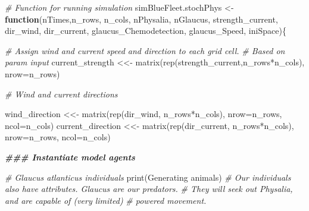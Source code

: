 \documentclass[
]{article}
\newenvironment{Shaded}{\begin{snugshade}}{\end{snugshade}}
\newcommand{\AttributeTok}[1]{\textcolor[rgb]{0.77,0.63,0.00}{#1}}
\newcommand{\CommentTok}[1]{\textcolor[rgb]{0.56,0.35,0.01}{\textit{#1}}}
\newcommand{\ControlFlowTok}[1]{\textcolor[rgb]{0.13,0.29,0.53}{\textbf{#1}}}
\newcommand{\DocumentationTok}[1]{\textcolor[rgb]{0.56,0.35,0.01}{\textbf{\textit{#1}}}}
\newcommand{\FunctionTok}[1]{\textcolor[rgb]{0.00,0.00,0.00}{#1}}
\newcommand{\NormalTok}[1]{#1}
\newcommand{\OtherTok}[1]{\textcolor[rgb]{0.56,0.35,0.01}{#1}}
\newcommand{\SpecialCharTok}[1]{\textcolor[rgb]{0.00,0.00,0.00}{#1}}
\newcommand{\StringTok}[1]{\textcolor[rgb]{0.31,0.60,0.02}{#1}}
\begin{document}
\begin{Shaded}
\begin{Highlighting}[]
\CommentTok{\# Function for running simulation }
\NormalTok{simBlueFleet.stochPhys }\OtherTok{\textless{}{-}} \ControlFlowTok{function}\NormalTok{(nTimes,n\_rows, n\_cols, nPhysalia, nGlaucus,}
\NormalTok{                                   strength\_current,}
\NormalTok{                                   dir\_wind, dir\_current,}
\NormalTok{                                   glaucus\_Chemodetection, glaucus\_Speed, iniSpace)\{}
  
  \CommentTok{\# Assign wind and current speed and direction to each grid cell.}
  \CommentTok{\# Based on param input}
\NormalTok{  current\_strength }\OtherTok{\textless{}\textless{}{-}} \FunctionTok{matrix}\NormalTok{(}\FunctionTok{rep}\NormalTok{(strength\_current,n\_rows}\SpecialCharTok{*}\NormalTok{n\_cols), }
                              \AttributeTok{nrow=}\NormalTok{n\_rows)}
  
  \CommentTok{\# Wind and current directions}
  
\NormalTok{  wind\_direction }\OtherTok{\textless{}\textless{}{-}} \FunctionTok{matrix}\NormalTok{(}\FunctionTok{rep}\NormalTok{(dir\_wind, n\_rows}\SpecialCharTok{*}\NormalTok{n\_cols), }
                            \AttributeTok{nrow=}\NormalTok{n\_rows, }\AttributeTok{ncol=}\NormalTok{n\_cols)}
\NormalTok{  current\_direction }\OtherTok{\textless{}\textless{}{-}} \FunctionTok{matrix}\NormalTok{(}\FunctionTok{rep}\NormalTok{(dir\_current, n\_rows}\SpecialCharTok{*}\NormalTok{n\_cols), }
                               \AttributeTok{nrow=}\NormalTok{n\_rows, }\AttributeTok{ncol=}\NormalTok{n\_cols)}
  
  
  \DocumentationTok{\#\#\# Instantiate model agents}
  
  \CommentTok{\# Glaucus atlanticus individuals}
  \FunctionTok{print}\NormalTok{(}\StringTok{\textquotesingle{}Generating animals\textquotesingle{}}\NormalTok{)}
  \CommentTok{\# Our individuals also have attributes. Glaucus are our predators.}
  \CommentTok{\# They will seek out Physalia, and are capable of (very limited)}
  \CommentTok{\# powered movement. }
  

\end{Highlighting}
\end{Shaded}
\end{document}

